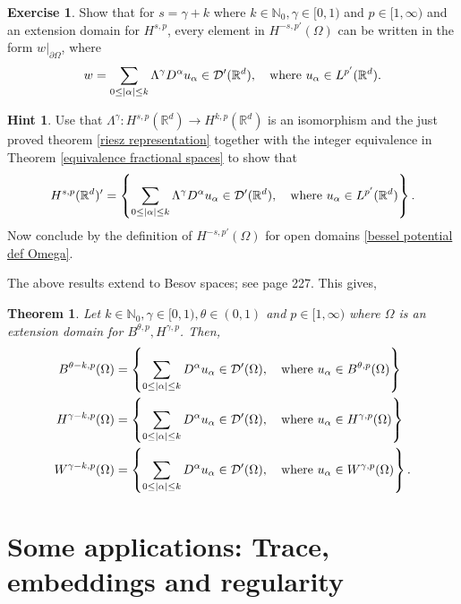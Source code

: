 \documentclass[
    a4paper,
    DIV=14,
    abstract=true,
    numbers=noenddot
]
{scrartcl}
\newtheorem{theorem}{Theorem}[section]
\theoremstyle{definition}
\newtheorem{exercise}{Exercise}
\newtheorem*{hint}{Hint}
\newcommand{\set}[1]{\left\{#1\right\}}
\newcommand\restr[2]{\left.#1\right|_{#2}}
\newcommand{\N}{\mathbb{N}}
\newcommand{\R}{\mathbb{R}}
\newcommand{\Dd}{\mathcal{D}}
\begin{document}
\begin{exercise}
    Show that for $s= \gamma +k$ where $k \in \N_0, \gamma \in [0,1)$  and $p \in [1,\infty)$ and an extension domain for $H^{s,p}$,    every element in $H^{-s,p'}(\Omega )$ can be written in the form $\restr{w}{\partial \Omega }$, where
    \begin{align*}
        w=\sum_{0\leq\abs{\alpha}\leq k} \Lambda^{\gamma } D^\alpha u_\alpha\in \Dd'(\R^d ),\quad \text{where }    u_\alpha \in L^{p'}(\R^d ).
    \end{align*}
\end{exercise}
\begin{hint}
    Use that $\Lambda ^{\gamma }: H^{s,p}(\R^d) \to H^{k ,p}(\R^d)$ is an isomorphism and the just proved theorem \ref{riesz representation} together with the integer equivalence in Theorem \ref{equivalence fractional spaces} to show that
    \begin{align*}
        H^{s,p}(\R^d)' = \set{ \sum_{0\leq\abs{\alpha}\leq k} \Lambda^{\gamma } D^\alpha u_\alpha\in \Dd'(\R^d ),\quad \text{where }    u_\alpha \in L^{p'}(\R^d )}.
    \end{align*}
    Now conclude by the definition of $H^{-s,p'}(\Omega )$ for open domains \ref{bessel potential def Omega}.
\end{hint}
The above results extend to Besov spaces; see \cite{agranovich2015sobolev} page 227. This gives,
\begin{theorem}
    Let  $k \in \N_0, \gamma \in [0,1), \theta \in (0,1)$ and $p \in [1,\infty)$ where $\Omega$ is an extension domain for $B^{\theta   ,p}, H^{\gamma ,p}$. Then,
    \begin{align*}
        B^{\theta  -k,p}(\Omega ) & = \set{ \sum_{0\leq\abs{\alpha}\leq k} D^\alpha u_\alpha\in \Dd'(\Omega ),\quad \text{where }    u_\alpha \in B^{\theta  ,p}(\Omega )} \\
        H^{\gamma -k,p}(\Omega )  & = \set{ \sum_{0\leq\abs{\alpha}\leq k} D^\alpha u_\alpha\in \Dd'(\Omega ),\quad \text{where }    u_\alpha \in H^{\gamma ,p}(\Omega )}  \\
        W^{\gamma -k,p}(\Omega )  & = \set{ \sum_{0\leq\abs{\alpha}\leq k} D^\alpha u_\alpha\in \Dd'(\Omega ),\quad \text{where }    u_\alpha \in W^{\gamma ,p}(\Omega )}.
    \end{align*}
\end{theorem}



\section{Some applications: Trace, embeddings and regularity}
\end{document}
